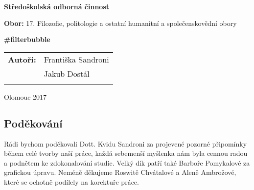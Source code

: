 \pagestyle{empty}
\begin{center}

\medskip

\vfill
{\bfseries\Large{Středoškolská odborná činnost}}

\medskip

{{\bfseries Obor: } 17. Filozofie, politologie a ostatní humanitní a společenskovědní obory}
\vfill


\vspace{20mm}

{\LARGE\bfseries \#filterbubble}

\vfill

\begin{tabular}{ll}
\bfseries Autoři: & Františka Sandroni\\
                  & Jakub Dostál\\
\noalign{\vspace{2mm}}
\end{tabular}

\vfill
Olomouc 2017
\end{center}


\newpage
\openright

\noindent
\subsection*{Poděkování}
\noindent Rádi bychom poděkovali Dott. Kvidu Sandroni za projevené pozorné připomínky během celé tvorby naší práce, každá sebemenší myšlenka nám byla cennou radou a podnětem ke zdokonalování studie. Velký dík patří také Barboře Pomykalové za grafickou úpravu. Neméně děkujeme Roswitě Chvátalové a Aleně Ambrožové, které se ochotně podílely na korektuře práce.



\newpage

